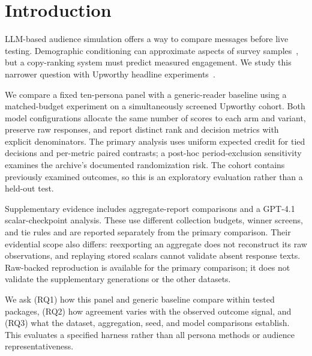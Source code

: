 \section{Introduction}
LLM-based audience simulation offers a way to compare messages before live testing.
Demographic conditioning can approximate aspects of survey samples~\citep{argyleSiliconSampling},
but a copy-ranking system must predict measured engagement. We study this narrower question with
Upworthy headline experiments~\citep{matiasUpworthy}.

We compare a fixed ten-persona panel with a generic-reader baseline using a matched-budget
experiment on a simultaneously screened Upworthy cohort. Both model configurations allocate the
same number of scores to each arm and variant, preserve raw responses, and report distinct rank
and decision metrics with explicit denominators. The primary analysis uses uniform expected
credit for tied decisions and per-metric paired contrasts; a post-hoc period-exclusion sensitivity
examines the archive's documented randomization risk. The cohort contains previously examined
outcomes, so this is an exploratory evaluation rather than a held-out test.

Supplementary evidence includes aggregate-report comparisons and a GPT-4.1 scalar-checkpoint
analysis. These use different collection budgets, winner screens, and tie rules and are reported
separately from the primary comparison. Their evidential scope also differs: reexporting an
aggregate does not reconstruct its raw observations, and replaying stored scalars cannot validate
absent response texts. Raw-backed reproduction is available for the primary comparison; it does
not validate the supplementary generations or the other datasets.

We ask (RQ1) how this panel and generic baseline compare within tested packages, (RQ2) how
agreement varies with the observed outcome signal, and (RQ3) what the dataset, aggregation,
seed, and model comparisons establish. This evaluates a specified harness rather than all
persona methods or audience representativeness.
